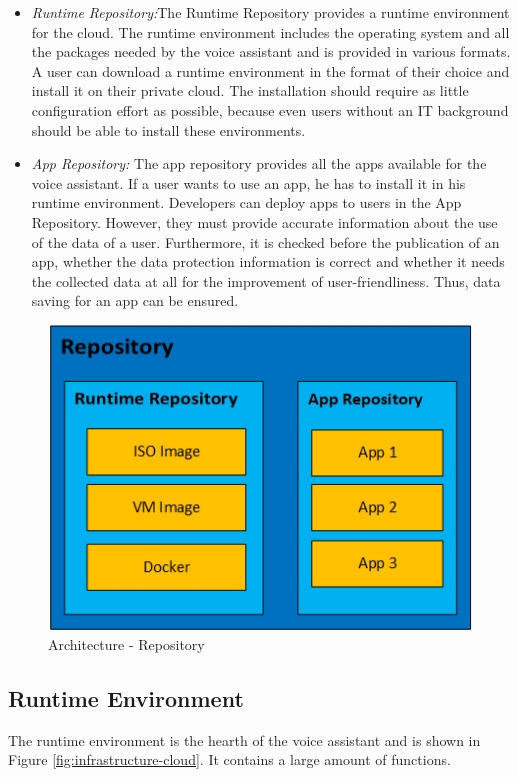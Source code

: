 \begin{itemize}
	\item \textsl{Runtime Repository:}The Runtime Repository provides a runtime environment for the cloud. The runtime environment includes the operating system and all the packages needed by the voice assistant and is provided in various formats. A user can download a runtime environment in the format of their choice and install it on their private cloud. The installation should require as little configuration effort as possible, because even users without an IT background should be able to install these environments. 
	\item \textsl{App Repository:} The app repository provides all the apps available for the voice assistant. If a user wants to use an app, he has to install it in his runtime environment. Developers can deploy apps to users in the App Repository. However, they must provide accurate information about the use of the data of a user. Furthermore, it is checked before the publication of an app, whether the data protection information is correct and whether it needs the collected data at all for the improvement of user-friendliness. Thus, data saving for an app can be ensured.
\end{itemize}


\begin{figure}[h!]
	\centering
	\includegraphics[width=0.6\linewidth]{Picture/Infrastruktur-Repository.jpg}
	\caption[Architecture - Mobile App]{Architecture - Repository}
	\label{fig:infrastruktur-repository}
\end{figure}

\subsection{Runtime Environment}
The runtime environment is the hearth of the voice assistant and is shown in Figure \ref{fig:infrastructure-cloud}. It contains a large amount of functions.

